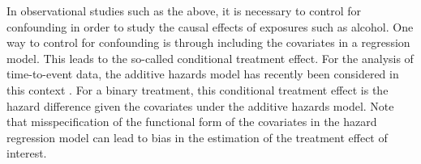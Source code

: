 \documentclass[11pt]{article}
\begin{document}
In observational studies such as the above, it is necessary to control for confounding in order to study the causal effects of exposures such as alcohol. One way to control for confounding is through including the covariates in a regression model. This leads to the so-called  conditional treatment effect. 
For the analysis of time-to-event data, 
 the additive hazards model \citep{Aalen,aalen1989linear} %
  has recently been considered in this context \citep{Dukes:19, hou2019estimating}.
 For a binary treatment, this conditional treatment effect is the hazard difference given the covariates under the additive hazards model. 
Note that misspecification of the functional form of the covariates in the hazard regression model can lead to  bias in the estimation of the treatment effect of interest.
\end{document}
